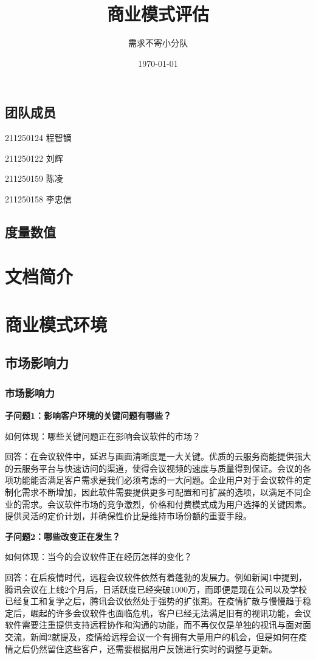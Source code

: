 \documentclass[a4paper,12pt]{article}
\title{商业模式评估}
\author{需求不寄小分队}
\date{\today}
\begin{document}
    \maketitle

    \tableofcontents


    \subsection{团队成员}
    211250124 程智镝

    211250122 刘辉

    211250159 陈凌

    211250158 李忠信
    \subsection{度量数值}

    \section{文档简介}
    

        \section{商业模式环境}
    \subsection{市场影响力}
    \subsubsection{市场影响力}
    \textbf{子问题1：影响客户环境的关键问题有哪些？}
    
    如何体现：哪些关键问题正在影响会议软件的市场？
    
    回答：在会议软件中，延迟与画⾯清晰度是⼀⼤关键。优质的云服务商能提供强⼤的云服务平台与快速访问的渠道，使得会议视频的速度与质量得到保证。会议的各项功能能否满⾜客户需求是我们必须考虑的⼀⼤问题。企业用户对于会议软件的定制化需求不断增加，因此软件需要提供更多可配置和可扩展的选项，以满足不同企业的需求。会议软件市场的竞争激烈，价格和付费模式成为用户选择的关键因素。提供灵活的定价计划，并确保性价比是维持市场份额的重要手段。
    
    \textbf{子问题2：哪些改变正在发生？}

    如何体现：当今的会议软件正在经历怎样的变化？

    回答：在后疫情时代，远程会议软件依然有着蓬勃的发展力。例如新闻1中提到，腾讯会议在上线2个⽉后，⽇活跃度已经突破1000万，⽽即便是现在公司以及学校已经复⼯和复学之后，腾讯会议依然处于强势的扩张期。在疫情扩散与慢慢趋于稳定后，崛起的许多会议软件也⾯临危机，客户已经⽆法满⾜旧有的视讯功能，会议软件需要注重提供支持远程协作和沟通的功能，而不再仅仅是单独的视讯与⾯对⾯交流，新闻2就提及，疫情给远程会议⼀个有拥有⼤量⽤户的机会，但是如何在疫情之后仍然留住这些客户，还需要根据⽤户反馈进⾏实时的调整与更新。
\end{document}
